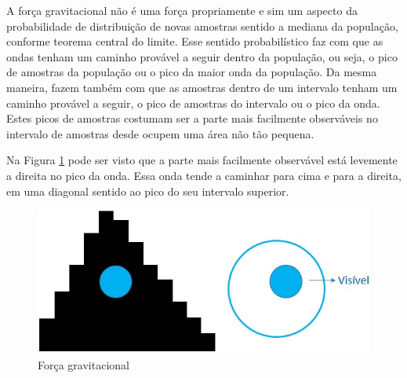 A força gravitacional não é uma força propriamente e sim um aspecto da probabilidade de distribuição de novas amostras sentido a mediana da população, conforme teorema central do limite. Esse sentido probabilístico faz com que as ondas tenham um caminho provável a seguir dentro da população, ou seja, o pico de amostras da população ou o pico da maior onda da população. Da mesma maneira, fazem também com que as amostras dentro de um intervalo tenham um caminho provável a seguir, o pico de amostras do intervalo ou o pico da onda. Estes picos de amostras costumam ser a parte mais facilmente observáveis no intervalo de amostras desde ocupem uma área não tão pequena.

Na Figura \ref{fig:consciousness_gravitational_force} pode ser visto que a parte mais facilmente observável está levemente a direita no pico da onda. Essa onda tende a caminhar para cima e para a direita, em uma diagonal sentido ao pico do seu intervalo superior. 
	\begin{figure}[H]
	\caption{Força gravitacional}
	\label{fig:consciousness_gravitational_force}
	\centering
	\includegraphics[scale=.7]{sections/images/consciousness_gravitational_force.jpg}
	\end{figure}

